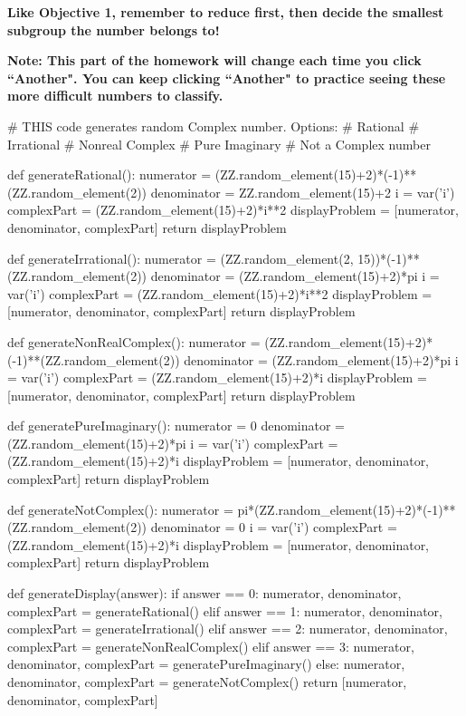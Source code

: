 \documentclass{ximera}
\begin{document}
\textbf{Like Objective 1, remember to reduce first, then decide the smallest subgroup the number belongs to!}

\textbf{Note: This part of the homework will change each time you click ``Another". You can keep clicking ``Another" to practice seeing these more difficult numbers to classify.}

\begin{sagesilent}
# THIS code generates random Complex number. Options:
    # Rational
    # Irrational
    # Nonreal Complex
    # Pure Imaginary
    # Not a Complex number

def generateRational():
    numerator = (ZZ.random_element(15)+2)*(-1)**(ZZ.random_element(2))
    denominator = ZZ.random_element(15)+2
    i = var('i')
    complexPart = (ZZ.random_element(15)+2)*i**2
    displayProblem = [numerator, denominator, complexPart]
    return displayProblem

def generateIrrational():
    numerator = (ZZ.random_element(2, 15))*(-1)**(ZZ.random_element(2))
    denominator = (ZZ.random_element(15)+2)*pi
    i = var('i')
    complexPart = (ZZ.random_element(15)+2)*i**2
    displayProblem = [numerator, denominator, complexPart]
    return displayProblem

def generateNonRealComplex():
    numerator = (ZZ.random_element(15)+2)*(-1)**(ZZ.random_element(2))
    denominator = (ZZ.random_element(15)+2)*pi
    i = var('i')
    complexPart = (ZZ.random_element(15)+2)*i
    displayProblem = [numerator, denominator, complexPart]
    return displayProblem

def generatePureImaginary():
    numerator = 0
    denominator = (ZZ.random_element(15)+2)*pi
    i = var('i')
    complexPart = (ZZ.random_element(15)+2)*i
    displayProblem = [numerator, denominator, complexPart]
    return displayProblem

def generateNotComplex():
    numerator = pi*(ZZ.random_element(15)+2)*(-1)**(ZZ.random_element(2))
    denominator = 0
    i = var('i')
    complexPart = (ZZ.random_element(15)+2)*i
    displayProblem = [numerator, denominator, complexPart]
    return displayProblem

def generateDisplay(answer):
    if answer == 0:
        numerator, denominator, complexPart = generateRational()
    elif answer == 1:
        numerator, denominator, complexPart = generateIrrational()
    elif answer == 2:
        numerator, denominator, complexPart = generateNonRealComplex()
    elif answer == 3:
        numerator, denominator, complexPart = generatePureImaginary()
    else:
        numerator, denominator, complexPart = generateNotComplex()
    return [numerator, denominator, complexPart]


\end{sagesilent}
\end{document}
